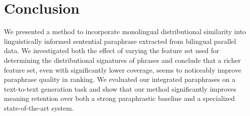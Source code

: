 \documentclass[11pt]{article}
\begin{document}
\section{Conclusion}
\label{sec-conclusion}

We presented a method to incorporate monolingual distributional
similarity into linguistically informed sentential paraphrase
extracted from bilingual parallel data. We investigated both the
effect of varying the feature set used for determining the
distributional signatures of phrases and conclude that a richer
feature set, even with significantly lower coverage, seems to
noticeably improve paraphrase quality in ranking. We evaluated our
integrated paraphrases on a text-to-text generation task and show that
our method significantly improves meaning retention over both a strong
paraphrastic baseline and a specialized state-of-the-art system.



\end{document}
